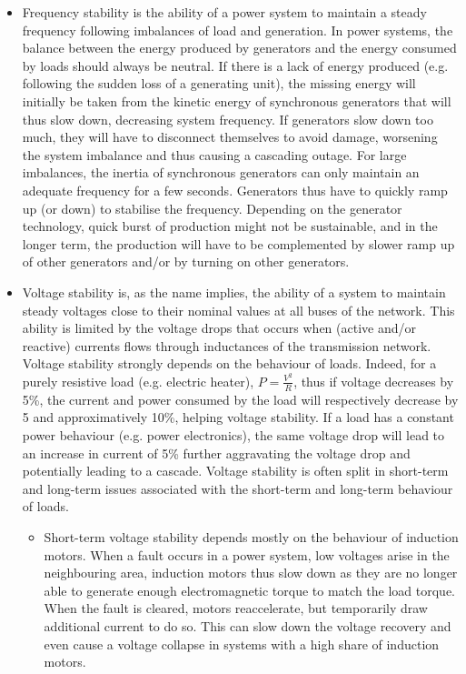 \begin{itemize}
    \item Frequency stability is the ability of a power system to maintain a steady frequency following imbalances of load and generation. In power systems, the balance between the energy produced by generators and the energy consumed by loads should always be neutral. If there is a lack of energy produced (e.g. following the sudden loss of a generating unit), the missing energy will initially be taken from the kinetic energy of synchronous generators that will thus slow down, decreasing system frequency. If generators slow down too much, they will have to disconnect themselves to avoid damage, worsening the system imbalance and thus causing a cascading outage. For large imbalances, the inertia of synchronous generators can only maintain an adequate frequency for a few seconds. Generators thus have to quickly ramp up (or down) to stabilise the frequency. Depending on the generator technology, quick burst of production might not be sustainable, and in the longer term, the production will have to be complemented by slower ramp up of other generators and/or by turning on other generators.
    \item Voltage stability is, as the name implies, the ability of a system to maintain steady voltages close to their nominal values at all buses of the network. This ability is limited by the voltage drops that occurs when (active and/or reactive) currents flows through inductances of the transmission network. Voltage stability strongly depends on the behaviour of loads. Indeed, for a purely resistive load (e.g. electric heater), \(P = \frac{V^2}{R}\), thus if voltage decreases by 5\%, the current and power consumed by the load will respectively decrease by 5 and approximatively 10\%, helping voltage stability. If a load has a constant power behaviour (e.g. power electronics), the same voltage drop will lead to an increase in current of 5\% further aggravating the voltage drop and potentially leading to a cascade. Voltage stability is often split in short-term and long-term issues associated with the short-term and long-term behaviour of loads.
    \begin{itemize}
        \item Short-term voltage stability depends mostly on the behaviour of induction motors. When a fault occurs in a power system, low voltages arise in the neighbouring area, induction motors thus slow down as they are no longer able to generate enough electromagnetic torque to match the load torque. When the fault is cleared, motors reaccelerate, but temporarily draw additional current to do so. This can slow down the voltage recovery and even cause a voltage collapse in systems with a high share of induction motors.

\end{itemize}
\end{itemize}
